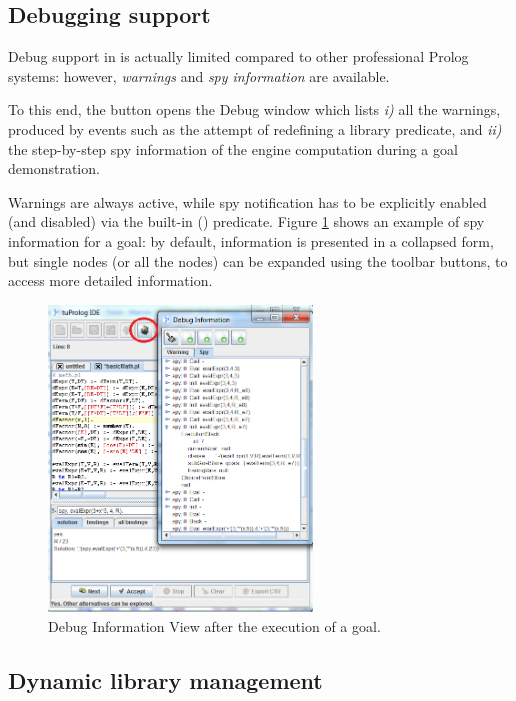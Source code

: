 \subsection{Debugging support}
\label{ssec:debugging-support}

Debug support in \tuprolog{} is actually limited compared to other professional Prolog systems: however, \textit{warnings} and \textit{spy information} are available.

To this end, the  button opens the Debug window which lists \textit{i)} all the warnings, produced by events such as the attempt of redefining a library predicate, and \textit{ii)} the step-by-step spy information of the engine computation during a goal demonstration.

Warnings are always active, while spy notification has to be explicitly enabled (and disabled) via the built-in  () predicate.
%
Figure \ref{fig:gui-debug} shows an example of spy information for a goal: by default, information is presented in a collapsed form, but single nodes (or all the nodes) can be expanded using the toolbar buttons, to access more detailed information.

\begin{figure}
\centering
\includegraphics[width=7cm]{images/gui-debug}
\caption{Debug Information View after the execution of a goal.}
\label{fig:gui-debug}
\end{figure}

\subsection{Dynamic library management}
\label{ssec:dynamic-library-management}

